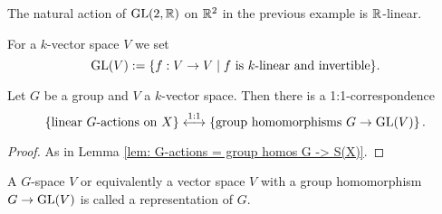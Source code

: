 \begin{expl}
 The natural action of $\operatorname{GL}(2,\mathbb{R})$ on $\mathbb{R}^2$ in the previous example is $\mathbb{R}$-linear.
\end{expl}


For a $k$-vector space $V$ we set
\[
 \operatorname{GL}(V) := \{f : V \to V \mid f \text{ is $k$-linear and invertible}\}.
\]


\begin{lem}
 Let $G$ be a group and $V$ a $k$-vector space. Then there is a 1:1-correspondence
 \[
    \left\{\text{linear $G$-actions on $X$}\right\}
  \overset{1:1}{\longleftrightarrow}
  \left\{\text{group homomorphisms $G \to \operatorname{GL}(V)$}\right\}.
 \]
\end{lem}
\begin{proof}
 As in Lemma \ref{lem: G-actions = group homos G -> S(X)}.
\end{proof}


\begin{rem}
 A $G$-space $V$ or equivalently a vector space $V$ with a group homomorphism $G \to \operatorname{GL}(V)$ is called a representation of $G$.
\end{rem}


